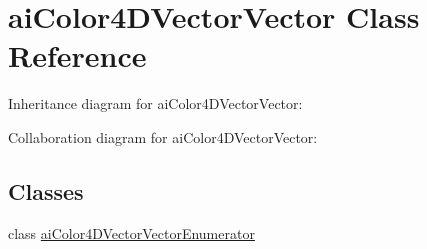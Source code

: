 \hypertarget{classai_color4_d_vector_vector}{\section{ai\+Color4\+D\+Vector\+Vector Class Reference}
\label{classai_color4_d_vector_vector}
}


Inheritance diagram for ai\+Color4\+D\+Vector\+Vector\+:


Collaboration diagram for ai\+Color4\+D\+Vector\+Vector\+:
\subsection*{Classes}
\begin{DoxyCompactItemize}
\item 
class \hyperlink{classai_color4_d_vector_vector_1_1ai_color4_d_vector_vector_enumerator}{ai\+Color4\+D\+Vector\+Vector\+Enumerator}
\end{DoxyCompactItemize}

